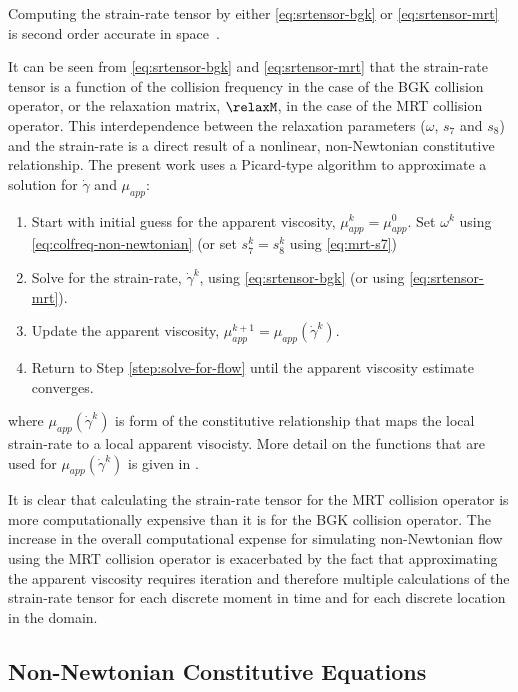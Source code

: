\noindent Computing the strain-rate tensor by either \eqref{eq:srtensor-bgk} or \eqref{eq:srtensor-mrt} is second order accurate in space~\cite{kruger2009shear,kruger2010second}.

It can be seen from \eqref{eq:srtensor-bgk} and \eqref{eq:srtensor-mrt} that the strain-rate tensor is a function of the collision frequency in the case of the BGK collision operator, or the relaxation matrix, $\relaxM$, in the case of the MRT collision operator.
This interdependence between the relaxation parameters ($\omega$, $s_7$ and $s_8$) and the strain-rate is a direct result of a nonlinear, non-Newtonian constitutive relationship.
The present work uses a Picard-type algorithm to approximate a solution for $\dot{\gamma}$ and $\mu_{app}$:

\label{sec:picard}
\begin{enumerate}
  \item Start with initial guess for the apparent viscosity, $\mu_{app}^k = \mu_{app}^0$.
	      Set $\omega^k$ using \eqref{eq:colfreq-non-newtonian} (or set $s_7^k = s_8^k$ using \eqref{eq:mrt-s7})
	\item \label{step:solve-for-flow} Solve for the strain-rate, $\dot{\gamma}^k$, using \eqref{eq:srtensor-bgk} (or using \eqref{eq:srtensor-mrt}).
  \item Update the apparent viscosity, $\mu_{app}^{k+1} = \mu_{app}(\dot{\gamma}^k)$.
	\item Return to Step \ref{step:solve-for-flow} until the apparent viscosity estimate converges.
\end{enumerate}
\noindent where $\mu_{app}(\dot{\gamma}^k)$ is form of the constitutive relationship that maps the local strain-rate to a local apparent visocisty.
More detail on the functions that are used for $\mu_{app}(\dot{\gamma}^k)$ is given in .

It is clear that calculating the strain-rate tensor for the MRT collision operator is more computationally expensive than it is for the BGK collision operator.
The increase in the overall computational expense for simulating non-Newtonian flow using the MRT collision operator is exacerbated by the fact that approximating the apparent viscosity requires iteration and therefore multiple calculations of the strain-rate tensor for each discrete moment in time and for each discrete location in the domain.

\subsection{Non-Newtonian Constitutive Equations} \label{sec:constit}

